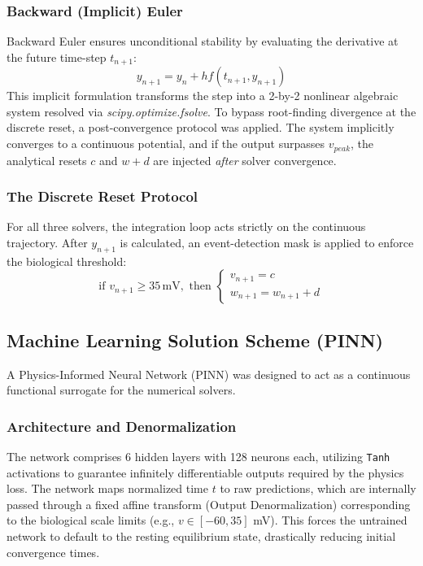 \documentclass[conference]{IEEEtran}
\begin{document}
\subsubsection{Backward (Implicit) Euler}
Backward Euler ensures unconditional stability by evaluating the derivative at the future time-step $t_{n+1}$:
\begin{equation}
    y_{n+1} = y_n + h f(t_{n+1}, y_{n+1})
\end{equation}
This implicit formulation transforms the step into a 2-by-2 nonlinear algebraic system resolved via \textit{scipy.optimize.fsolve}. To bypass root-finding divergence at the discrete reset, a post-convergence protocol was applied. The system implicitly converges to a continuous potential, and if the output surpasses $v_{peak}$, the analytical resets $c$ and $w+d$ are injected \textit{after} solver convergence.

\subsubsection{The Discrete Reset Protocol}
For all three solvers, the integration loop acts strictly on the continuous trajectory. After $y_{n+1}$ is calculated, an event-detection mask is applied to enforce the biological threshold:
\begin{equation}
    \text{if } v_{n+1} \geq 35\,\text{mV}, \text{ then } 
    \begin{cases} 
        v_{n+1} = c \\ 
        w_{n+1} = w_{n+1} + d 
    \end{cases}
\end{equation}

\subsection{Machine Learning Solution Scheme (PINN)}

A Physics-Informed Neural Network (PINN) was designed to act as a continuous functional surrogate for the numerical solvers.

\subsubsection{Architecture and Denormalization}
The network comprises 6 hidden layers with 128 neurons each, utilizing \texttt{Tanh} activations to guarantee infinitely differentiable outputs required by the physics loss. The network maps normalized time $t$ to raw predictions, which are internally passed through a fixed affine transform (Output Denormalization) corresponding to the biological scale limits (e.g., $v \in [-60, 35]$ mV). This forces the untrained network to default to the resting equilibrium state, drastically reducing initial convergence times.
\end{document}
